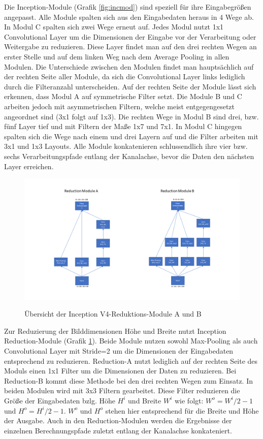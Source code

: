 Die Inception-Module (Grafik \ref{fig:incmod}) sind speziell für ihre Eingabegrößen angepasst. Alle Module spalten sich aus den Eingabedaten heraus in 4 Wege ab. In Modul C spalten sich zwei Wege erneut auf. Jedes Modul nutzt 1x1 Convolutional Layer um die Dimensionen der Eingabe vor der Verarbeitung oder Weitergabe zu reduzieren. Diese Layer findet man auf den drei rechten Wegen an erster Stelle und auf dem linken Weg nach dem Average Pooling in allen Modulen. Die Unterschiede zwischen den Modulen findet man hauptsächlich auf der rechten Seite aller Module, da sich die Convolutional Layer links lediglich durch die Filteranzahl unterscheiden. Auf der rechten Seite der Module lässt sich erkennen, dass Modul A auf symmetrische Filter setzt. Die Module B und C arbeiten jedoch mit asymmetrischen Filtern, welche meist entgegengesetzt angeordnet sind (3x1 folgt auf 1x3). Die rechten Wege in Modul B sind drei, bzw. fünf Layer tief und mit Filtern der Maße 1x7 und 7x1. In Modul C hingegen spalten sich die Wege nach einem und drei Layern auf und die Filter arbeiten mit 3x1 und 1x3 Layouts. Alle Module konkatenieren schlussendlich ihre vier bzw. sechs Verarbeitungspfade entlang der Kanalachse, bevor die Daten den nächsten Layer erreichen.

\begin{figure}[H]
\centering
\caption[Caption for LOF]{Übersicht der Inception V4-Reduktions-Module A und B}
\includegraphics[scale=0.5]{pictures/Inception/Reduction}
\label{fig:incred}
\end{figure}

Zur Reduzierung der Bilddimensionen Höhe und Breite nutzt Inception Reduction-Module (Grafik \ref{fig:incred}). Beide Module nutzen sowohl Max-Pooling als auch Convolutional Layer mit Stride=2 um die Dimensionen der Eingabedaten entsprechend zu reduzieren. Reduction-A nutzt lediglich auf der rechten Seite des Moduls einen 1x1 Filter um die Dimensionen der Daten zu reduzieren. Bei Reduction-B kommt diese Methode bei den drei rechten Wegen zum Einsatz. In beiden Modulen wird mit 3x3 Filtern gearbeitet. Diese Filter reduzieren die Größe der Eingabedaten bzlg. Höhe $H^i$ und Breite $W^i$ wie folgt: $W^o = W^i / 2 - 1$ und $H^o = H^i / 2 - 1$. $W^o$ und $H^o$ stehen hier entsprechend für die Breite und Höhe der Ausgabe. Auch in den Reduction-Modulen werden die Ergebnisse der einzelnen Berechnungspfade zuletzt entlang der Kanalachse konkateniert. 

